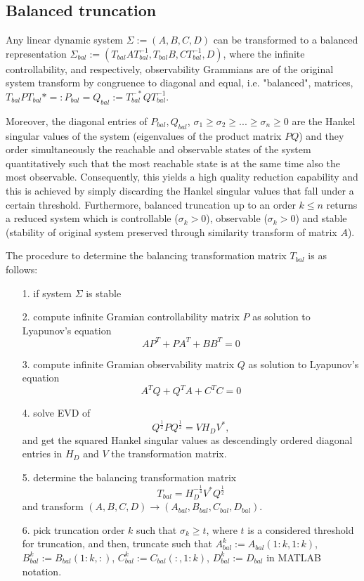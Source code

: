 \documentclass[10pt,a4paper]{article}
\begin{document}
\subsection{Balanced truncation}
Any linear dynamic system $\Sigma := (A,B,C,D)$ can be transformed to a balanced representation $\Sigma_{bal} := (T_{bal}AT^{-1}_{bal},T_{bal}B,CT_{bal}^{-1},D)$, where the infinite controllability, and respectively, observability Grammians are of the original system transform by congruence to diagonal and equal, i.e. "balanced", matrices, $T_{bal}PT_{bal}* =: P_{bal} = Q_{bal} := T_{bal}^{-*}QT_{bal}^{-1}$. 

Moreover, the diagonal entries of $P_{bal}, Q_{bal}$, $\sigma_1 \geq \sigma_2 \geq  ... \geq \sigma_n\geq 0$ are the Hankel singular values of the system (eigenvalues of the product matrix $PQ$) and they order simultaneously the reachable and observable states of the system quantitatively such that the most reachable state is at the same time also the most observable. Consequently, this yields a high quality reduction capability and this is achieved by simply discarding the Hankel singular values that  fall under a certain threshold. Furthermore, balanced truncation up to an order $k \leq n$ returns a reduced system which is controllable ($\sigma_k > 0$), observable ($\sigma_k > 0$) and stable (stability of original system preserved through similarity transform of matrix $A$).

The procedure to determine the balancing transformation matrix $T_{bal}$ is as follows:
\begin{itemize}
\item [1.] if system $\Sigma$ is stable
\item [2.] \hspace{0.3cm} compute infinite Gramian controllability matrix $P$ as solution to Lyapunov's equation $$AP^T+PA^T+BB^T = 0$$
\item [3.] \hspace{0.3cm} compute infinite Gramian observability matrix $Q$ as solution to Lyapunov's equation $$A^TQ+Q^TA+C^TC = 0$$
\item [4.]\hspace{0.3cm} solve EVD of $$Q^{\frac{1}{2}}PQ^{\frac{1}{2}} = VH_DV^*,$$ and get the squared Hankel singular values as descendingly ordered diagonal entries in $H_D$ and $V$ the transformation matrix.
\item[5.] \hspace{0.3cm} determine the balancing transformation matrix $$T_{bal} = H_D^{-\frac{1}{4}}V^*Q^{\frac{1}{2}}$$ and transform $(A,B,C,D) \rightarrow (A_{bal}, B_{bal}, C_{bal}, D_{bal})$.
\item[6.] \hspace{0.3cm} pick truncation order $k$ such that $\sigma_k \geq t$, where $t$ is a considered threshold for truncation, and then, truncate such that $A^k_{bal} := A_{bal}(1:k,1:k)$, $B^k_{bal} := B_{bal}(1:k,:)$, $C^k_{bal} := C_{bal}(:,1:k)$, $D^k_{bal}:=D_{bal}$ in MATLAB notation.   
\end{itemize}
\end{document}
